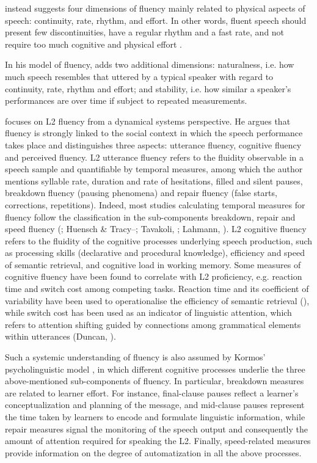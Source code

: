 \citet{Starkweather1987} instead suggests four dimensions of fluency mainly related to physical aspects of speech: continuity, rate, rhythm, and effort. In other words, fluent speech should present few discontinuities, have a regular rhythm and a fast rate, and not require too much cognitive and physical effort \citep{Zmarich2017}.

In his model of fluency, \citet{Logan2015} adds two additional dimensions: naturalness, i.e. how much speech resembles that uttered by a typical speaker with regard to continuity, rate, rhythm and effort; and stability, i.e. how similar a speaker’s performances are over time if subject to repeated measurements.

\citet{Segalowitz2010} focuses on L2 fluency from a dynamical systems perspective. He argues that fluency is strongly linked to the social context in which the speech performance takes place and distinguishes three aspects: utterance fluency, cognitive fluency and perceived fluency. L2 utterance fluency refers to the fluidity observable in a speech sample and quantifiable by temporal measures, among which the author mentions syllable rate, duration and rate of hesitations, filled and silent pauses, breakdown fluency (pausing phenomena) and repair fluency (false starts, corrections, repetitions). Indeed, most studies calculating temporal measures for fluency follow the classification in the sub-components breakdown, repair and speed fluency (\citealt{TavakoliSkehan2005}; Huensch \& Tracy–\citealt{Ventura2017}; Tavakoli, \citealt{NakatsuharaHunter2020}; Lahmann, \citealt{SteinkraussSchmid2017}). L2 cognitive fluency refers to the fluidity of the cognitive processes underlying speech production, such as processing skills (declarative and procedural knowledge), efficiency and speed of semantic retrieval, and cognitive load in working memory. Some measures of cognitive fluency have been found to correlate with L2 proficiency, e.g. reaction time and switch cost among competing tasks. Reaction time and its coefficient of variability have been used to operationalise the efficiency of semantic retrieval (\citealt{SegalowitzFreed2004}), while switch cost has been used as an indicator of linguistic attention, which refers to attention shifting guided by connections among grammatical elements within utterances (Duncan, \citealt{SegalowitzPhillips2014}).

Such a systemic understanding of fluency is also assumed by Kormos’ psycholinguistic model \citep{Kormos2006}, in which different cognitive processes underlie the three above-mentioned sub-components of fluency. In particular, breakdown measures are related to learner effort. For instance, final-clause pauses reflect a learner’s conceptualization and planning of the message, and mid-clause pauses represent the time taken by learners to encode and formulate linguistic information, while repair measures signal the monitoring of the speech output and consequently the amount of attention required for speaking the L2. Finally, speed-related measures provide information on the degree of automatization in all the above processes.


